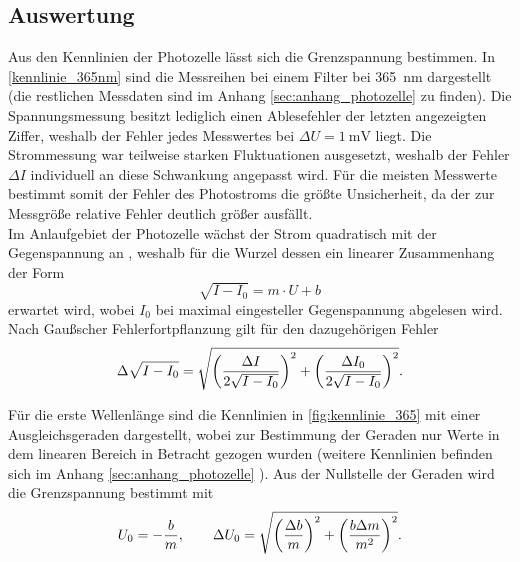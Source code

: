 \subsection{Auswertung}
Aus den Kennlinien der Photozelle lässt sich die Grenzspannung bestimmen. In \cref{kennlinie_365nm} sind die
Messreihen bei einem Filter bei \SI{365}{\nano\meter} dargestellt (die restlichen Messdaten sind im Anhang
\ref{sec:anhang_photozelle} zu finden). Die Spannungsmessung besitzt lediglich einen Ablesefehler der letzten
angezeigten Ziffer, weshalb der Fehler jedes Messwertes bei $\Delta U = \SI{1}{\milli\volt}$ liegt.
Die Strommessung war teilweise starken Fluktuationen ausgesetzt, weshalb der Fehler $\Delta I$
individuell an diese Schwankung angepasst wird. Für die meisten Messwerte bestimmt somit der Fehler
des Photostroms die größte Unsicherheit, da der zur Messgröße relative Fehler deutlich größer ausfällt.\\
Im Anlaufgebiet der Photozelle wächst der Strom quadratisch mit der Gegenspannung an
\cite[S.21]{skript},
weshalb für die Wurzel dessen ein linearer Zusammenhang der Form
\begin{equation}
	\sqrt{I - I_0} = m\cdot U + b \nonumber
\end{equation}
erwartet wird, wobei $I_0$ bei maximal eingesteller Gegenspannung abgelesen wird.
Nach Gaußscher Fehlerfortpflanzung\cite{wiki:fehlerfortpflanzung} gilt für den dazugehörigen Fehler
\begin{equation}
	\Delta\sqrt{I - I_0} = \sqrt{\qty(\frac{\Delta I}{2\sqrt{I-I_0}})^2 + \qty(\frac{\Delta I_0}{2\sqrt{I-I_0}})^2} .\nonumber
\end{equation}



Für die erste Wellenlänge sind die Kennlinien in \cref{fig:kennlinie_365} mit einer Ausgleichsgeraden
dargestellt, wobei zur Bestimmung der Geraden nur Werte in dem linearen Bereich in Betracht gezogen wurden
(weitere Kennlinien befinden sich im Anhang \ref{sec:anhang_photozelle}
). Aus der Nullstelle der Geraden wird die Grenzspannung
bestimmt mit
\begin{equation}
	U_0 = - \frac{b}{m},\qquad \Delta U_0 = \sqrt{\qty(\frac{\Delta b}{m})^2 + \qty(\frac{b\Delta m}{m^2})^2} .
	\nonumber
	\label{eq:bestimmung_grenzspannung}
\end{equation}




